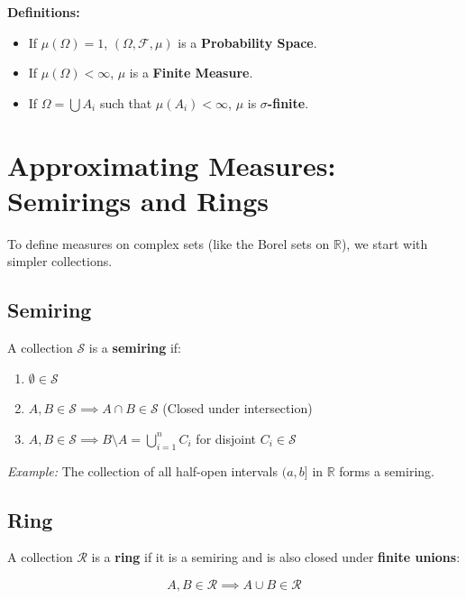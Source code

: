 \documentclass{article}
\begin{document}
\textbf{Definitions:}
\begin{itemize}
    \item If $\mu(\Omega) = 1$, $(\Omega, \mathscr{F}, \mu)$ is a \textbf{Probability Space}.
    \item If $\mu(\Omega) < \infty$, $\mu$ is a \textbf{Finite Measure}.
    \item If $\Omega = \bigcup A_i$ such that $\mu(A_i) < \infty$, $\mu$ is \textbf{$\sigma$-finite}.
\end{itemize}

\section{Approximating Measures: Semirings and Rings}
To define measures on complex sets (like the Borel sets on $\mathbb{R}$), we start with simpler collections.

\subsection{Semiring}
A collection $\mathcal{S}$ is a \textbf{semiring} if:
\begin{enumerate}
    \item $\emptyset \in \mathcal{S}$
    \item $A, B \in \mathcal{S} \implies A \cap B \in \mathcal{S}$ (Closed under intersection)
    \item $A, B \in \mathcal{S} \implies B \setminus A = \bigcup_{i=1}^n C_i$ for disjoint $C_i \in \mathcal{S}$
\end{enumerate}
\textit{Example:} The collection of all half-open intervals $(a, b]$ in $\mathbb{R}$ forms a semiring.

\subsection{Ring}
A collection $\mathcal{R}$ is a \textbf{ring} if it is a semiring and is also closed under \textbf{finite unions}:

\[ A, B \in \mathcal{R} \implies A \cup B \in \mathcal{R} \]
\end{document}
